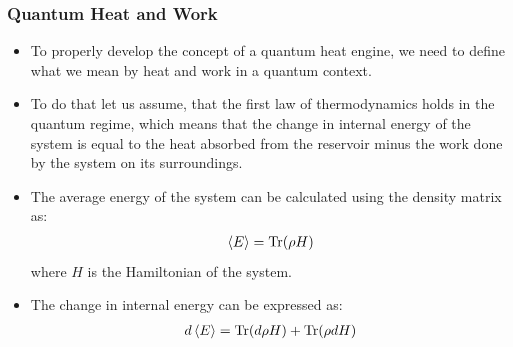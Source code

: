 \documentclass{beamer}
\begin{document}
    \begin{frame}
        \frametitle{Quantum Heat and Work}
        \begin{itemize}
            \item To properly develop the concept of a quantum heat engine, we need to define what we mean by heat and work in a quantum context. \pause
            \item To do that let us assume, that the first law of thermodynamics holds in the quantum regime, which means that the change in internal energy of the system is equal to the heat absorbed from the reservoir minus the work done by the system on its surroundings. \pause
            \item The average energy of the system can be calculated using the density matrix as:
            \begin{align*}
                \expval{E} = \Tr(\rho H)
            \end{align*}
            where $H$ is the Hamiltonian of the system. \pause
            \item The change in internal energy can be expressed as:
            \begin{align*}
                d\expval{E} = \Tr(d\rho H) + \Tr(\rho dH)
            \end{align*}
            \end{itemize}
    \end{frame}
\end{document}
